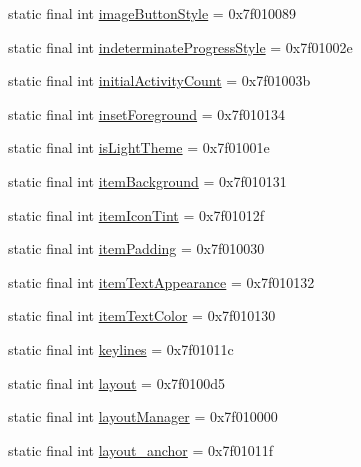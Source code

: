 \begin{CompactItemize}
static final int \hyperlink{classandroid_1_1support_1_1v7_1_1mediarouter_1_1_r_1_1attr_5013c0057853f7a74d93d211d891601e}{imageButtonStyle} = 0x7f010089
\item 
static final int \hyperlink{classandroid_1_1support_1_1v7_1_1mediarouter_1_1_r_1_1attr_9d89bf01d4de14984e7a6ca683e26832}{indeterminateProgressStyle} = 0x7f01002e
\item 
static final int \hyperlink{classandroid_1_1support_1_1v7_1_1mediarouter_1_1_r_1_1attr_bc73a238a622f244fdd0c2e2ab471cdf}{initialActivityCount} = 0x7f01003b
\item 
static final int \hyperlink{classandroid_1_1support_1_1v7_1_1mediarouter_1_1_r_1_1attr_d45aa97360f51745abdb317af060d98a}{insetForeground} = 0x7f010134
\item 
static final int \hyperlink{classandroid_1_1support_1_1v7_1_1mediarouter_1_1_r_1_1attr_9f45dec89825319bf09503440fe7af1b}{isLightTheme} = 0x7f01001e
\item 
static final int \hyperlink{classandroid_1_1support_1_1v7_1_1mediarouter_1_1_r_1_1attr_9673efe86a4740f6c266a3ed68271a06}{itemBackground} = 0x7f010131
\item 
static final int \hyperlink{classandroid_1_1support_1_1v7_1_1mediarouter_1_1_r_1_1attr_c3770ad531bb94c28471a73c6051c538}{itemIconTint} = 0x7f01012f
\item 
static final int \hyperlink{classandroid_1_1support_1_1v7_1_1mediarouter_1_1_r_1_1attr_c5533ef2b1bf3b130d6d168c720a39f4}{itemPadding} = 0x7f010030
\item 
static final int \hyperlink{classandroid_1_1support_1_1v7_1_1mediarouter_1_1_r_1_1attr_747757ae4579474c4020cc14d41c1356}{itemTextAppearance} = 0x7f010132
\item 
static final int \hyperlink{classandroid_1_1support_1_1v7_1_1mediarouter_1_1_r_1_1attr_e277cbbb0857cb6d4bbd3e662be6f13a}{itemTextColor} = 0x7f010130
\item 
static final int \hyperlink{classandroid_1_1support_1_1v7_1_1mediarouter_1_1_r_1_1attr_02cd1fce908e667aba4419a270c7b3c9}{keylines} = 0x7f01011c
\item 
static final int \hyperlink{classandroid_1_1support_1_1v7_1_1mediarouter_1_1_r_1_1attr_811c9ef0aa74194b976ff5473ac65bde}{layout} = 0x7f0100d5
\item 
static final int \hyperlink{classandroid_1_1support_1_1v7_1_1mediarouter_1_1_r_1_1attr_776f05090184756508d1ca27ad318411}{layoutManager} = 0x7f010000
\item 
static final int \hyperlink{classandroid_1_1support_1_1v7_1_1mediarouter_1_1_r_1_1attr_ce18c2eb30d1e499d9fba993d9383887}{layout\_\-anchor} = 0x7f01011f

\end{CompactItemize}
